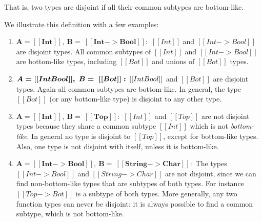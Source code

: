 \noindent That is, two types are disjoint if all their common subtypes are bottom-like.
\begin{comment}
With this definition we have that different primitive types are disjoint. For example
$[[Int]] * [[Bool]]$ since the only common subtypes of $[[Int]]$ and $[[Bool]]$
are bottom-like. A more interesting case is the disjointness of two function types.
It turns out that function types are never disjoint, since we can always find
a common subtype for any two function types. For example, if we have $[[Int -> Bool]]$
and $[[String -> Char]]$ then a common subtype that is not bottom-like is
$[[Top -> Bot]]$. Therefore, $[[Int -> Bool]]$ and $[[String -> Char]]$ are not
disjoint.

\noindent Reader may think at this point that $[[Bot]]$ type can simply be used in \Cref{def:union:disj}
instead of $[[botlike C]]$ in the conclusion. Answer to this question is
union type with $[[Bot]]$ as all primitive types is also a least subtype in \cal.
$[[botlike C]]$ also handles this case.
\end{comment}
We illustrate this definition with a few examples:

\begin{enumerate}
  \item $\boldsymbol{A = [[Int]], \ B = \ [[Int -> Bool]]:}$
        $[[Int]]$ and $[[Int -> Bool]]$ are disjoint types. All common subtypes
        of $[[Int]]$ and $[[Int -> Bool]]$ are bottom-like types,
        including $[[Bot]]$ and unions of $[[Bot]]$ types.
  \item $\boldsymbol{A = [[Int \/ Bool]], \ B = \ [[Bot]]:}$
    $[[Int \/ Bool]]$ and $[[Bot]]$ are disjoint types. Again all common subtypes are bottom-like.
    In general, the type $[[Bot]]$ (or any bottom-like type)
    is disjoint to any other type.
  \item $\boldsymbol{A = [[Int]], \ B = \ [[Top]]:}$
        $[[Int]]$ and $[[Top]]$ are not disjoint types because they share a common
    subtype $[[Int]]$ which is not \emph{bottom-like}. In general no type
    is disjoint to $[[Top]]$, except for bottom-like types.
    Also, one type is not disjoint with itself, unless it is bottom-like.
  \item $\boldsymbol{A = [[Int -> Bool]], \ B = \ [[String -> Char]]:}$
    The types $[[Int -> Bool]]$ and $[[String -> Char]]$ are not disjoint,
    since we can find non-bottom-like types that are subtypes
    of both types. For instance $[[Top -> Bot]]$ is a subtype of both types.
    More generally, any two function types can never be disjoint: it is always
    possible to find a common subtype, which is not bottom-like.
\end{enumerate}

